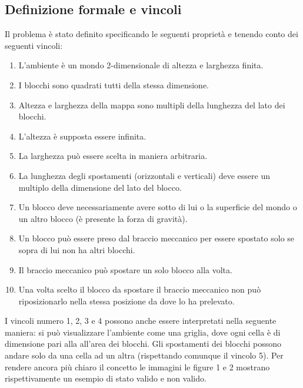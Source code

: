 \documentclass{article}
\begin{document}
	\subsection{Definizione formale e vincoli}
	Il problema è stato definito specificando le seguenti proprietà e tenendo conto dei seguenti vincoli:
	\begin{enumerate}
		\item L'ambiente è un mondo 2-dimensionale di altezza e larghezza finita.
		\item I blocchi sono quadrati tutti della stessa dimensione.
		\item Altezza e larghezza della mappa sono multipli della lunghezza del lato dei blocchi.
		\item L'altezza è supposta essere infinita.
		\item La larghezza può essere scelta in maniera arbitraria.
		\item La lunghezza degli spostamenti (orizzontali e verticali) deve essere un multiplo della dimensione del lato del blocco.
		\item Un blocco deve necessariamente avere sotto di lui o la superficie del mondo o un altro blocco (è presente la forza di gravità).
		\item Un blocco può essere preso dal braccio meccanico per essere spostato solo se sopra di lui non ha altri blocchi.
		\item Il braccio meccanico può spostare un solo blocco alla volta.
		\item Una volta scelto il blocco da spostare il braccio meccanico non può riposizionarlo nella stessa posizione da dove lo ha prelevato.
	\end{enumerate}
	I vincoli numero 1, 2, 3 e 4 possono anche essere interpretati nella seguente maniera: si può visualizzare l'ambiente come una griglia, dove ogni cella è di dimensione pari alla all'area dei blocchi. Gli spostamenti dei blocchi possono andare solo da una cella ad un altra (rispettando comunque il vincolo 5). Per rendere ancora più chiaro il concetto le immagini le figure 1 e 2 mostrano rispettivamente un esempio di stato valido e non valido.
\end{document}
